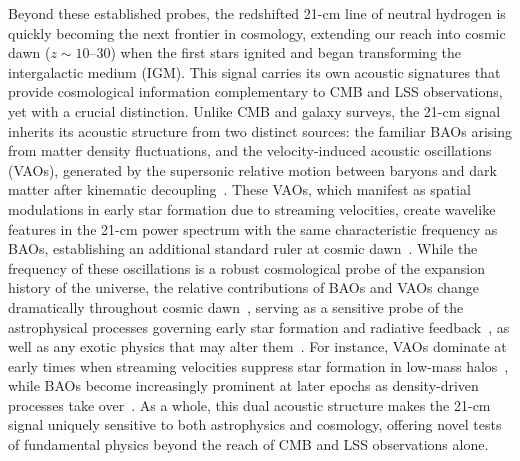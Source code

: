 \documentclass[floats,floatfix,showpacs,amssymb,prd,twocolumn,superscriptaddress,nofootinbib,reprint,preprintnumbers]{revtex4-2}
\begin{document}
Beyond these established probes, the redshifted 21-cm line of neutral hydrogen is quickly becoming the next frontier in cosmology, extending our reach into cosmic dawn ($z\sim10$–$30$) when the first stars ignited and began transforming the intergalactic medium (IGM). This signal carries its own acoustic signatures that provide cosmological information complementary to CMB and LSS observations, yet with a crucial distinction. Unlike CMB and galaxy surveys, the 21-cm signal inherits its acoustic structure from two distinct sources: the familiar BAOs arising from matter density fluctuations, and the velocity-induced acoustic oscillations (VAOs), generated by the supersonic relative motion between baryons and dark matter after kinematic decoupling~\citep{visbal12, mcquinn12, fialkov12, Fialkov:2013uwm, munoz19}. These VAOs, which manifest as spatial modulations in early star formation due to streaming velocities, create wavelike features in the 21-cm power spectrum with the same characteristic frequency as BAOs, establishing an additional standard ruler at cosmic dawn~\cite{munoz19b, Sarkar:2022mdz}. While the frequency of these oscillations is a robust cosmological probe of the expansion history of the universe, the relative contributions of BAOs and VAOs change dramatically throughout cosmic dawn~\citep{cruz25},  serving as a sensitive probe of the astrophysical processes governing early star formation and radiative feedback~\citep{munoz20,Libanore:2023oxf,Zhang:2024pwv, verwohlt2024}, as well as any exotic physics that may alter them~\citep{Hotinli:2021vxg,Hotinli:2021xln, cruz24}. For instance, VAOs dominate at early times when streaming velocities suppress star formation in low-mass halos~\citep{mcquinn12, schauer19, kulkarni21}, while BAOs become increasingly prominent at later epochs as density-driven processes take over~\citep{cruz25}. As a whole, this dual acoustic structure makes the 21-cm signal uniquely sensitive to both astrophysics and cosmology, offering novel tests of fundamental physics beyond the reach of CMB and LSS observations alone.
\end{document}

